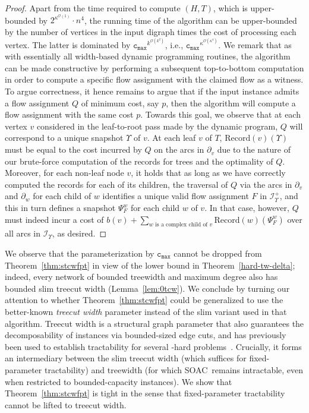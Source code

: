 \documentclass[letterpaper]{article} %
\newcommand{\bigoh}{\ensuremath{{\mathcal O}}}
\newcommand{\problem}{{\sc SOAC}\xspace} %
\newcommand{\cmax}{\mathtt{c_{max}}}
\newcommand{\Rec}{\text{Record}}
\begin{document}
\begin{proof}
Apart from the time required to compute $(H,T)$, which is upper-bounded by $2^{\kappa^{\bigoh(1)}}\cdot n^4$,
the running time of the algorithm can be upper-bounded by the number of vertices in the input digraph times the cost of processing each vertex. The latter is dominated by $\cmax^{k^{\bigoh(k^2)}}$, i.e., $\cmax^{\kappa^{\bigoh(\kappa^4)}}$. We remark that as with essentially all width-based dynamic programming routines, the algorithm can be made constructive by performing a subsequent top-to-bottom computation in order to compute a specific flow assignment with the claimed flow as a witness. To argue correctness, it hence remains to argue that if the input instance admits a flow assignment $Q$ of minimum cost, say $p$, then the algorithm will compute a flow assignment with the same cost $p$. Towards this goal, we observe that at each vertex $v$ considered in the leaf-to-root pass made by the dynamic program, $Q$ will correspond to a unique snapshot $\Upsilon$ of $v$. At each leaf $v$ of $T$, $\Rec(v)(\Upsilon)$ must be equal to the cost incurred by $Q$ on the arcs in $\partial_v$ due to the nature of our brute-force computation of the records for trees and the optimality of $Q$. Moreover, for each non-leaf node $v$, it holds that as long as we have correctly computed the records for each of its children, the traversal of $Q$ via the arcs in $\partial_v$ and $\partial_w$ for each child of $w$ identifies a unique valid flow assignment $F$ in $\mathcal{I}^+_\Upsilon$, and this in turn defines a snapshot $\Psi^w_F$ for each child $w$ of $v$. In that case, however, $Q$ must indeed incur a cost of $b(v)+\sum_{w\text{ is a complex child of }v}\Rec(w)(\Psi^w_F)$ over all arcs in $\mathcal{I}_\Upsilon$, as desired.
\end{proof}

We observe that the parameterization by $\cmax$ cannot be dropped from Theorem~\ref{thm:stcwfpt} in view of the lower bound in Theorem~\ref{hard-tw-delta}; indeed, every network of bounded treewidth and maximum degree also has bounded slim treecut width (Lemma~\ref{lem:0tcw}). We conclude by turning our attention to whether Theorem~\ref{thm:stcwfpt} could be generalized to use the better-known \emph{treecut width} parameter instead of the slim variant used in that algorithm. Treecut width is a structural graph parameter that also guarantees the decomposability of instances via bounded-sized edge cuts, and has previously been used to establish tractability for several \NP-hard problems~\cite{GanianKS22}. Crucially, it forms an intermediary between the slim treecut width (which suffices for fixed-parameter tractability) and treewidth (for which \problem\ remains intractable, even when restricted to bounded-capacity instances). We show that Theorem~\ref{thm:stcwfpt} is tight in the sense that fixed-parameter tractability cannot be lifted to treecut width. 
\end{document}
